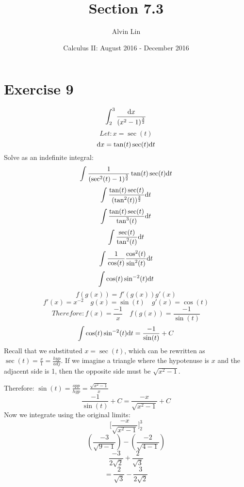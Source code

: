 \documentclass{math}
\title{Section 7.3}
\author{Alvin Lin}
\date{Calculus II: August 2016 - December 2016}
\begin{document}
\maketitle

\section*{Exercise 9}
\[ \int_{2}^{3}{\frac{\mathrm{d}{x}}{(x^{2}-1)^{\frac{3}{2}}}} \]
\[ Let: x = \sec(t) \]
\[ \mathrm{d}{x} = \tan(t)\sec(t)\mathrm{d}{t} \]
Solve as an indefinite integral:
\[ \int{\frac{1}{(\sec^{2}(t)-1)^{\frac{3}{2}}}\tan(t)\sec(t)\mathrm{d}{t}} \]
\[ \int{\frac{\tan(t)\sec(t)}{(\tan^{2}(t))^{\frac{3}{2}}}\mathrm{d}{t}} \]
\[ \int{\frac{\tan(t)\sec(t)}{\tan^{3}(t)}\mathrm{d}{t}} \]
\[ \int{\frac{\sec(t)}{\tan^{2}(t)}\mathrm{d}{t}} \]
\[ \int{\frac{1}{\cos(t)}\frac{\cos^{2}(t)}{\sin^{2}(t)}\mathrm{d}{t}} \]
\[ \int{\cos(t)\sin^{-2}(t)\mathrm{d}{t}} \]
\[ f(g(x)) = f'(g(x))g'(x) \]
\[ f'(x) = x^{-2} \quad g(x) = \sin(t) \quad g'(x) = \cos(t) \]
\[ Therefore: f(x) = \frac{-1}{x} \quad f(g(x)) = \frac{-1}{\sin(t)} \]
\[ \int{\cos(t)\sin^{-2}(t)\mathrm{d}{t}} = \frac{-1}{\sin(t)}+C \]
Recall that we substituted \( x = \sec(t) \), which can be rewritten as
\( \sec(t) = \frac{x}{1} = \frac{hyp}{adj} \). If we imagine a triangle where
the hypotenuse is \( x \) and the adjacent side is 1, then the opposite side
must be \( \sqrt{x^{2}-1} \).
\begin{center}
\end{center}
Therefore: \( \sin(t) = \frac{opp}{hyp} = \frac{\sqrt{x^{2}-1}}{x} \)
\[ \frac{-1}{\sin(t)}+C = \frac{-x}{\sqrt{x^{2}-1}}+C \]
Now we integrate using the original limits:
\[ \bigg[\frac{-x}{\sqrt{x^{2}-1}}\bigg]_{2}^{3} \]
\[ (\frac{-3}{\sqrt{9-1}})-(\frac{-2}{\sqrt{4-1}}) \]
\[ \frac{-3}{2\sqrt{2}}+\frac{2}{\sqrt{3}} \]
\[ = \frac{2}{\sqrt{3}}-\frac{3}{2\sqrt{2}} \]
\end{document}
